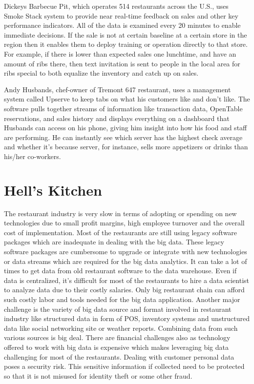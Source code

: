 \documentclass[sigconf]{acmart}
\begin{document}
Dickeys Barbecue Pit, which operates 514 restaurants across the U.S., uses Smoke Stack system to provide near real-time feedback on sales and other key performance indicators. All of the data is examined every 20 minutes to enable immediate decisions. If the sale is not at certain baseline at a certain store in the region then it enables them to deploy training or operation directly to that store. For example, if there is lower than expected sales one lunchtime, and have an amount of ribs there, then text invitation is sent to people in the local area for ribs special to both equalize the inventory and catch up on sales\cite{www-forbes}.
 
Andy Husbands, chef-owner of Tremont 647 restaurant, uses a management system called Upserve to keep tabs on what his customers like and don't like. 
The software pulls together streams of information like transaction data, OpenTable reservations, and sales history and displays everything on a dashboard that Husbands can access on his phone, giving him insight into how his food and staff are performing. He can instantly see which server has the highest check 
average and whether it's because server, for instance, sells more appetizers or drinks than his/her co-workers\cite{www-bostonglobe}.

\section{Hell's Kitchen}
The restaurant industry is very slow in terms of adopting or spending on new technologies due to small profit margins, high employee turnover and the overall cost of implementation\cite{www-bostonglobe}. Most of the restaurants are still using legacy software packages which are inadequate in dealing with the big data. These legacy software packages are cumbersome to upgrade or integrate with new technologies or data streams which are required for the big data analytics. It can take a lot of times to get data from old restaurant software to the data warehouse. Even if data is centralized, it's difficult for most of the restaurants to hire a data scientist to analyze data due to their costly salaries. Only big restaurant chain can afford such costly labor and tools needed for the big data application\cite{2015BDLC}. Another major challenge is the variety of big data source and format involved in restaurant industry like structured data in form of POS, inventory systems and unstructured data like social networking site or weather reports. Combining data from such various sources is big deal. There are financial challenges also as technology offered to work with big data is expensive which makes leveraging big data challenging for most of the restaurants\cite{www-foodnewsfeed}. Dealing with customer personal data poses a security risk. This sensitive information if collected need to be protected so that it is not misused for identity theft or some other fraud\cite{www-restaurant}.
\end{document}
